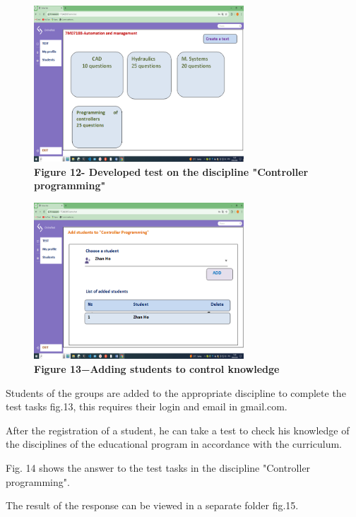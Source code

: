 \begin{figure}[H]
	\centering
	\includegraphics[width=0.7\textwidth]{assets/137}
	\caption*{\bfseries Figure 12- Developed test on the discipline "Controller
	programming"}
\end{figure}



\begin{figure}[H]
	\centering
	\includegraphics[width=0.7\textwidth]{assets/138}
	\caption*{\bfseries Figure 13−Adding students to control knowledge}
\end{figure}

\begin{multicols}{2}
Students of the groups are added to the appropriate discipline to
complete the test tasks fig.13, this requires their login and email in
gmail.com.


After the registration of a student, he can take a test to check his
knowledge of the disciplines of the educational program in accordance
with the curriculum.

Fig. 14 shows the answer to the test tasks in the discipline "Controller
programming".


The result of the response can be viewed in a separate folder fig.15.
\end{multicols}



